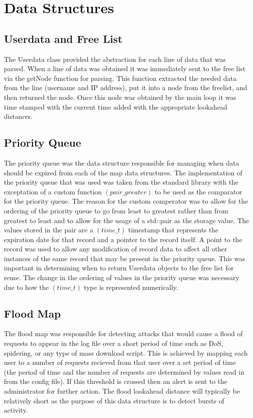 \documentclass[12pt]{report}
\begin{document}
\section*{Data Structures}
	\subsection*{Userdata and Free List}
	The Userdata class provided the abstraction for each line of data that
	was parsed. When a line of data was obtained it was immediately sent to the
	free list via the getNode function for parsing. This function extracted the
	needed data from the line (username and IP address), put it into a node from
	the freelist, and then returned the node. Once this node was obtained by the 
	main loop it was time stamped with the current time added with the appropriate	lookahead distances.
	
	\subsection*{Priority Queue}
	The priority queue was the data	structure responsible for managing when data 
	should be expired from each of the map data structures. The implementation
	of the priority queue that was used was taken from the standard library with
	the exceptation of a custom function $(pair\_greater)$ to be used as the comparator
	for the priority queue. The reason for the custom comperator was to allow for the
	ordering of the priority queue to go from least to greatest rather than from 
	greatest to least and to allow for the usage of a std::pair as the storage value. The 
	values stored in the pair are a $(time\_t)$ timestamp that represents the expiration 
	date for that record and a pointer to the record itself. A point to the record was 
	used to allow any modification of record data to affect all other instances of the 
	same record that may be present in the priority queue. This was important in 
	determining when to return Userdata objects to the free list for reuse. The change in 
	the ordering of values in the priority queue was necessary due to how the $(time\_t)$
	type is represented numerically.

	\subsection*{Flood Map}
	The flood map was responsible for detecting attacks that would cause a flood 
	of requests to appear in the log file over a short period of time such as
	DoS, spidering, or any type of mass download script. This is achieved by mapping
	each user to a number of requests recieved from that user over a set period of time
	(the period of time and the number of requests are determined by values read in from
	the config file). If this threshold is crossed then an alert is sent to the administrator for further action. The flood lookahead distance will typically be
	relatively short as the purpose of this data structure is to detect bursts of 
	activity.
\end{document}
